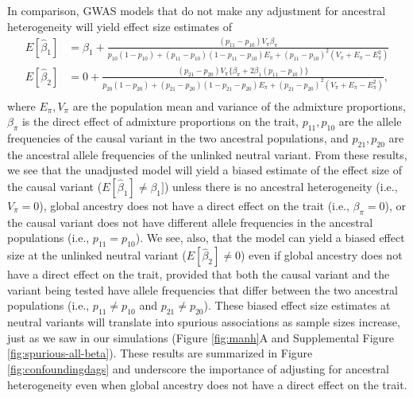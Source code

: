 \documentclass[12pt]{article}
\begin{document}
In comparison, GWAS models that do not make any adjustment for ancestral heterogeneity will yield effect size estimates of
$$
\begin{aligned}
E[\hat\beta_1] & = \beta_1 + \frac{(p_{11}- p_{10})V_\pi \beta_\pi }{p_{10}(1-p_{10}) + (p_{11}-p_{10})(1-p_{11}-p_{10})E_\pi + (p_{11}-p_{10})^2(V_\pi + E_\pi - E_\pi^2)} \\
E[\hat\beta_2] & = 0 + \frac{(p_{21}-p_{20}) V_\pi\{\beta_\pi + 2\beta_1(p_{11}- p_{10})\}}{p_{20}(1-p_{20}) + (p_{21}-p_{20})(1-p_{21}-p_{20})E_\pi + (p_{21}-p_{20})^2(V_\pi + E_\pi - E_\pi^2)},\\
\end{aligned}
$$
where $E_\pi, V_\pi$ are the population mean and variance of the admixture proportions, $\beta_\pi$ is the direct effect of admixture proportions on the trait, $p_{11}, p_{10}$ are the allele frequencies of the causal variant in the two ancestral populations, and $p_{21}, p_{20}$ are the ancestral allele frequencies of the unlinked neutral variant.
From these results, we see that the unadjusted model will yield a biased estimate of the effect size of the causal variant ($E[\hat\beta_1] \neq \beta_1]$) unless there is no ancestral heterogeneity (i.e., $V_\pi = 0$), global ancestry does not have a direct effect on the trait (i.e., $\beta_\pi = 0$), or the causal variant does not have different allele frequencies in the ancestral populations (i.e., $p_{11} = p_{10}$). 
We see, also, that the model can yield a biased effect size at the unlinked neutral variant ($E[\hat\beta_2] \neq 0$) even if global ancestry does not have a direct effect on the trait, provided that both the causal variant and the variant being tested have allele frequencies that differ between the two ancestral populations (i.e., $p_{11} \neq p_{10}$ and $p_{21} \neq p_{20}$).
These biased effect size estimates at neutral variants will translate into spurious associations as sample sizes increase, just as we saw in our simulations (Figure \ref{fig:manh}A and Supplemental Figure \ref{fig:spurious-all-beta}).
These results are summarized in Figure \ref{fig:confoundingdags} and underscore the importance of adjusting for ancestral heterogeneity even when global ancestry does not have a direct effect on the trait.
\end{document}
